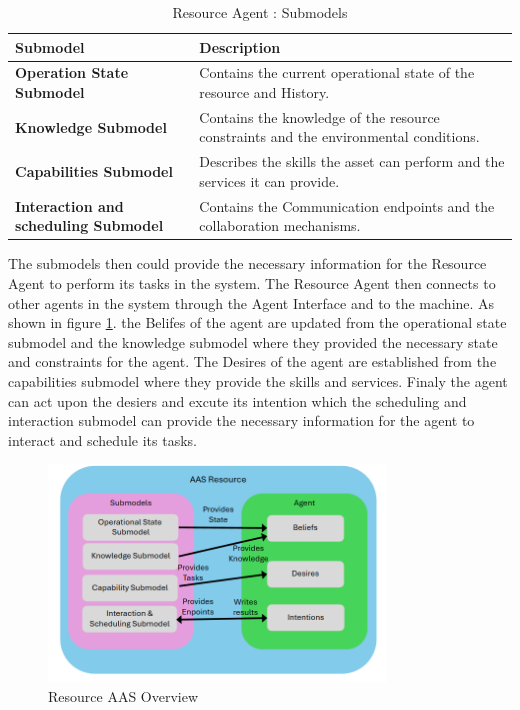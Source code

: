 \begin{table}[h]
\centering
\begin{tabularx}{\textwidth}{>{\raggedright\arraybackslash}X>{\raggedright\arraybackslash}X}
\toprule
\rowcolor[HTML]{38FFF8}
\textbf{Submodel} & \textbf{Description} \\ \midrule
\textbf{Operation State Submodel} & Contains the current operational state of the resource and History. \\
\textbf{Knowledge Submodel} & Contains the knowledge of the resource constraints and the environmental conditions. \\
\textbf{Capabilities Submodel} & Describes the skills the asset can perform and the services it can provide. \\
\textbf{Interaction and scheduling Submodel} & Contains the Communication endpoints and the collaboration mechanisms. \\
\bottomrule
\end{tabularx}
\caption{Resource Agent : Submodels}
\label{table:resource_aas_submodels}
\end{table}
The submodels then could provide the necessary information for the Resource Agent to perform its tasks in the system.
The Resource Agent then connects to other agents in the system through the Agent Interface and to the machine.
As shown in figure \ref{fig:resource_aas_overview}. the Belifes of the agent are updated from the
operational state submodel and the knowledge submodel where they provided the necessary state and constraints for the agent.
The Desires of the agent are established from the capabilities submodel
where they provide the skills and services.
Finaly the agent can act upon the desiers and excute its intention which the scheduling and interaction submodel
can provide the necessary information for the agent to interact and schedule its tasks.
\begin{figure}[h]
    \centering
    \includegraphics[width=0.8\textwidth]{Images/Resource_Agent_overview.png}
    \caption{Resource AAS Overview}
    \label{fig:resource_aas_overview}
\end{figure}

